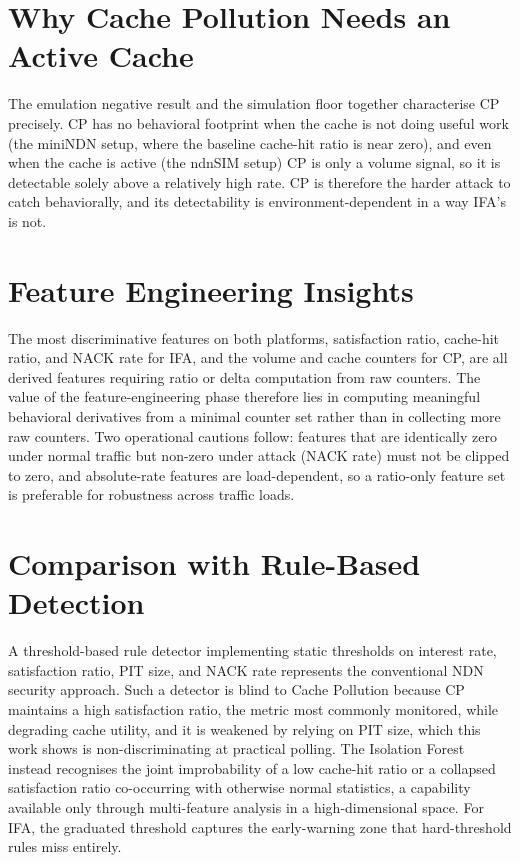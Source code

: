 \documentclass[12pt]{report}
\begin{document}
\section{Why Cache Pollution Needs an Active Cache}

The emulation negative result and the simulation floor together characterise CP precisely. CP has no behavioral footprint when the cache is not doing useful work (the miniNDN setup, where the baseline cache-hit ratio is near zero), and even when the cache is active (the ndnSIM setup) CP is only a volume signal, so it is detectable solely above a relatively high rate. CP is therefore the harder attack to catch behaviorally, and its detectability is environment-dependent in a way IFA's is not.

\section{Feature Engineering Insights}

The most discriminative features on both platforms, satisfaction ratio, cache-hit ratio, and NACK rate for IFA, and the volume and cache counters for CP, are all derived features requiring ratio or delta computation from raw counters. The value of the feature-engineering phase therefore lies in computing meaningful behavioral derivatives from a minimal counter set rather than in collecting more raw counters. Two operational cautions follow: features that are identically zero under normal traffic but non-zero under attack (NACK rate) must not be clipped to zero, and absolute-rate features are load-dependent, so a ratio-only feature set is preferable for robustness across traffic loads.

\section{Comparison with Rule-Based Detection}

A threshold-based rule detector implementing static thresholds on interest rate, satisfaction ratio, PIT size, and NACK rate represents the conventional NDN security approach. Such a detector is blind to Cache Pollution because CP maintains a high satisfaction ratio, the metric most commonly monitored, while degrading cache utility, and it is weakened by relying on PIT size, which this work shows is non-discriminating at practical polling. The Isolation Forest instead recognises the joint improbability of a low cache-hit ratio or a collapsed satisfaction ratio co-occurring with otherwise normal statistics, a capability available only through multi-feature analysis in a high-dimensional space. For IFA, the graduated threshold captures the early-warning zone that hard-threshold rules miss entirely.
\end{document}
